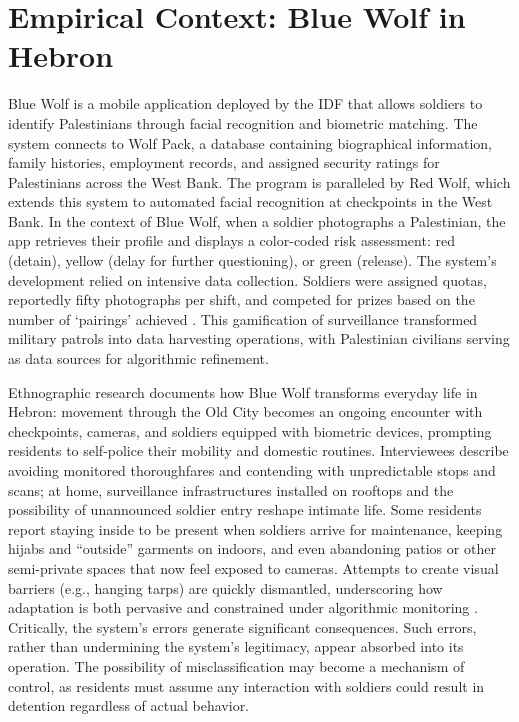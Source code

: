 \documentclass[11pt,a4paper]{article}
\theoremstyle{definition}
\theoremstyle{remark}
\theoremstyle{definition}
\begin{document}
\section{Empirical Context: Blue Wolf in Hebron}

Blue Wolf is a mobile application deployed by the IDF that allows soldiers to identify Palestinians through facial recognition and biometric 
matching. The system connects to Wolf Pack, a database containing biographical information, family histories, employment records, and assigned 
security ratings for Palestinians across the West Bank. The program is paralleled by Red Wolf, which extends this system to automated facial recognition 
at checkpoints in the West Bank. In the context of Blue Wolf, when a soldier photographs a Palestinian, the app retrieves their profile and displays a 
color-coded risk assessment: 
red (detain), yellow (delay for further questioning), or green (release). The system's development relied on intensive data collection. Soldiers were 
assigned quotas, reportedly fifty photographs per shift, and competed for prizes based on the number of `pairings' achieved \citep{kubovich2022israeli}. 
This gamification of surveillance \citep{benjamin2019playing} transformed military patrols into data harvesting operations, with Palestinian civilians 
serving as data sources for algorithmic refinement.

Ethnographic research documents how Blue Wolf transforms everyday life in Hebron: movement through the Old City becomes an ongoing encounter 
with checkpoints, cameras, and soldiers equipped with biometric devices, prompting residents to self-police their mobility and domestic routines. 
Interviewees describe avoiding monitored thoroughfares and contending with unpredictable stops and scans; at home, surveillance infrastructures 
installed on rooftops and the possibility of unannounced soldier entry reshape intimate life. Some residents report staying inside to be present 
when soldiers arrive for maintenance, keeping hijabs and ``outside'' garments on indoors, and even abandoning patios or other semi-private spaces 
that now feel exposed to cameras. Attempts to create visual barriers (e.g., hanging tarps) are quickly dismantled, underscoring how adaptation 
is both pervasive and constrained under algorithmic monitoring \citep{goodfriend2023algorithmic}. Critically, the system's errors generate 
significant consequences. Such errors, rather than undermining the system's legitimacy, appear absorbed into its operation. The possibility of 
misclassification may become a mechanism of control, as residents must assume any interaction with soldiers could result in detention regardless 
of actual behavior. 
\end{document}

